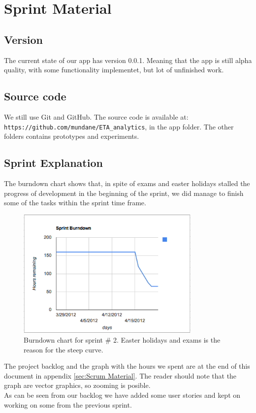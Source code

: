 \section{Sprint Material} %
\label{sec:Sprint Material}
\subsection{Version} %
\label{sub:Version}
The current state of our app has version 0.0.1. Meaning that the app is still alpha quality, with some functionality implementet, but lot of unfinished work.
\subsection{Source code} %
\label{sub:Source code}
We still use Git and GitHub. The source code is available at: \verb!https://github.com/mundane/ETA_analytics!, in the app folder. The other folders contains prototypes and experiments.
\subsection{Sprint Explanation}
The burndown chart shows that, in spite of exams and easter holidays stalled the progress of development in the beginning of the sprint, we did manage to finish some of the tasks within the sprint time frame.
\begin{figure}[h!]
  \centering
    \includegraphics[width=0.8\textwidth]{images/burndown.png}
	\caption{Burndown chart for sprint \# 2. Easter holidays and exams is the reason for the steep curve.}
\end{figure}
The project backlog and the graph with the hours we spent are at the end of this document in appendix \ref{sec:Scrum Material}. The reader should note that the graph are vector graphics, so zooming is posible. \\
As can be seen from our backlog we have added some user stories and kept on working on some from the previous sprint.
